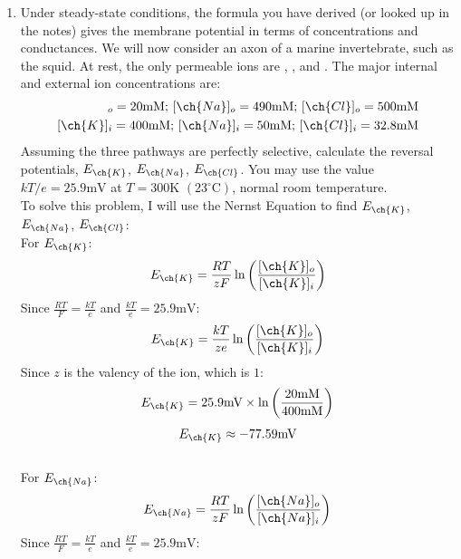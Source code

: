 \documentclass[11pt]{article}
\begin{document}
\begin{enumerate}[label=\arabic*.]
\begin{enumerate}[label=\alph*.]
\vspace*{1\baselineskip}
\item
Under steady-state conditions, the formula you have derived (or looked up in the notes) gives the membrane potential in terms of concentrations and conductances. We will now consider an axon of a marine invertebrate, such as the squid. At rest, the only permeable ions are , , and . The major internal and external ion concentrations are:
\begin{align*}
[\ch{K}]_o = 20 \text{mM}\text{; }[\ch{Na}]_o = 490 \text{mM}\text{; }[\ch{Cl}]_o = 500 \text{mM} \\
[\ch{K}]_i = 400 \text{mM}\text{; }[\ch{Na}]_i = 50 \text{mM}\text{; }[\ch{Cl}]_i = 32.8 \text{mM}
\end{align*}
Assuming the three pathways are perfectly selective, calculate the reversal potentials, $E_{\ch{K}}$, $E_{\ch{Na}}$, $E_{\ch{Cl}}$. You may use the value $kT/e = 25.9 \text{mV}$ at $T =300 \text{K}$ $\left(23 ^{\circ}\text{C}\right)$, normal room temperature.
\vspace*{1\baselineskip}
\\
To solve this problem, I will use the Nernst Equation to find $E_{\ch{K}}$, $E_{\ch{Na}}$, $E_{\ch{Cl}}$:
\vspace*{1\baselineskip}
\\
For $E_{\ch{K}}$:
\begin{align*}
E_{\ch{K}} = \frac{RT} {zF} \ln{\left(\frac{[\ch{K}]_o} {[\ch{K}]_i}\right)}
\end{align*}
Since $\frac{RT} {F} = \frac{kT} {e}$ and $\frac{kT} {e} = 25.9 \text{mV}$:
\begin{align*}
E_{\ch{K}} = \frac{kT} {ze} \ln{\left(\frac{[\ch{K}]_o} {[\ch{K}]_i}\right)}
\end{align*}
Since $z$ is the valency of the  ion, which is $1$:
\begin{align*}
E_{\ch{K}} = 25.9 \text{mV} \times \ln{\left(\frac{20 \text{mM}} {400 \text{mM}}\right)}
\end{align*}
\begin{align*}
E_{\ch{K}} \approx -77.59 \text{mV}
\end{align*}
\vspace*{1\baselineskip}
\\
For $E_{\ch{Na}}$:
\begin{align*}
E_{\ch{Na}} = \frac{RT} {zF} \ln{\left(\frac{[\ch{Na}]_o} {[\ch{Na}]_i}\right)}
\end{align*}
Since $\frac{RT} {F} = \frac{kT} {e}$ and $\frac{kT} {e} = 25.9 \text{mV}$:

\end{enumerate}
\end{enumerate}
\end{document}
